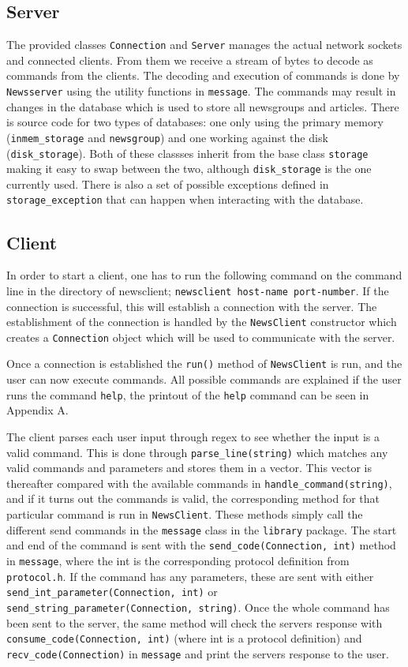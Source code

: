 \documentclass[a4paper]{article}
\begin{document}
\subsection{Server}
\label{subsec:server}
The provided classes \texttt{Connection} and \texttt{Server} manages the actual network sockets and connected clients. From them we receive a stream of bytes to decode as commands from the clients. The decoding and execution of commands is done by \texttt{Newsserver} using the utility functions in \texttt{message}. The commands may result in changes in the database which is used to store all newsgroups and articles. There is source code for two types of databases: one only using the primary memory (\texttt{inmem\_storage} and \texttt{newsgroup}) and one working against the disk (\texttt{disk\_storage}). Both of these classses inherit from the base class \texttt{storage} making it easy to swap between the two, although \texttt{disk\_storage} is the one currently used. There is also a set of possible exceptions defined in \texttt{storage\_exception} that can happen when interacting with the database.


\subsection{Client}
\label{subsec:client}
In order to start a client, one has to run the following command on the command line in the directory of newsclient; \texttt{newsclient host-name port-number}. If the connection is successful, this will establish a connection with the server. The establishment of the connection is handled by the \texttt{NewsClient} constructor which creates a \texttt{Connection} object which will be used to communicate with the server.

Once a connection is established the \texttt{run()} method of \texttt{NewsClient} is run, and the user can now execute commands. All possible commands are explained if the user runs the command \texttt{help}, the printout of the \texttt{help} command can be seen in Appendix A.

The client parses each user input through regex to see whether the input is a valid command. This is done through \texttt{parse\_line(string)} which matches any valid commands and parameters and stores them in a vector. This vector is thereafter compared with the available commands in \texttt{handle\_command(string)}, and if it turns out the commands is valid, the corresponding method for that particular command is run in \texttt{NewsClient}. These methods simply call the different send commands in the \texttt{message} class in the \texttt{library} package. The start and end of the command is sent with the \texttt{send\_code(Connection, int)} method in \texttt{message}, where the int is the corresponding protocol definition from \texttt{protocol.h}. If the command has any parameters, these are sent with either \texttt{send\_int\_parameter(Connection, int)} or \texttt{send\_string\_parameter(Connection, string)}. Once the whole command has been sent to the server, the same method will check the servers response with \texttt{consume\_code(Connection, int)} (where int is a protocol definition) and \texttt{recv\_code(Connection)} in \texttt{message} and print the servers response to the user.
\end{document}
